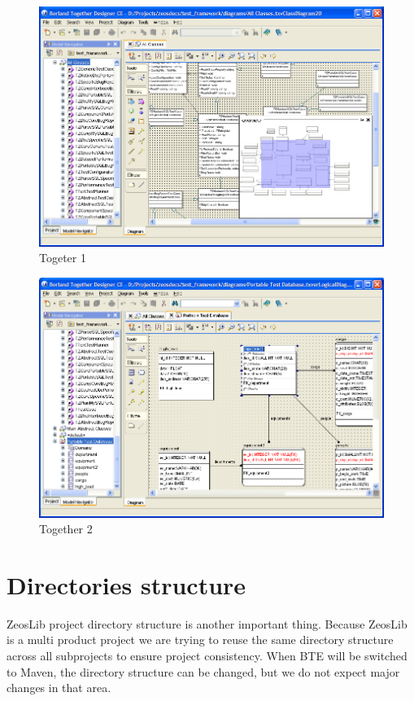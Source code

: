 \documentclass[a4paper,12pt,oneside]{book}
\begin{document}
\begin{figure}[htbp] 
  \centering
  \includegraphics[width=1.0\textwidth]{BTE/Together1.png}
  \caption{Togeter 1}
  \label{fig:Together1}
\end{figure}

\begin{figure}[htbp] 
  \centering
  \includegraphics[width=1.0\textwidth]{BTE/Together2.png}
  \caption{Together 2}
  \label{fig:Together2}
\end{figure}

\section{Directories structure}
ZeosLib project directory structure is another important thing.
Because ZeosLib is a multi product project we are trying to reuse the same directory structure across all subprojects to ensure project consistency.
When BTE will be switched to Maven, the directory structure can be changed, but we do not expect major changes in that area.
\end{document}
